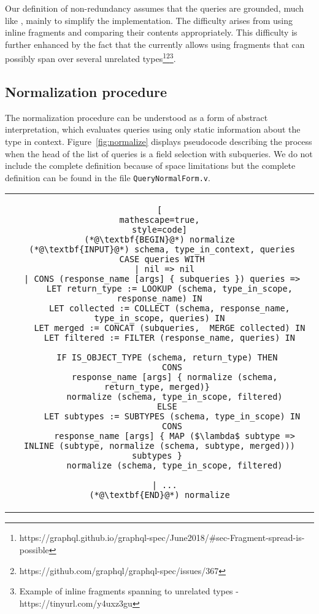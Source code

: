 Our definition of non-redundancy assumes that the queries are grounded, much like \HP{}, mainly to simplify the implementation. The difficulty arises from using inline fragments and comparing their contents appropriately. This difficulty is further enhanced by the fact that the \spec{} currently allows using fragments that can possibly span over several unrelated types\footnote{https://graphql.github.io/graphql-spec/June2018/\#sec-Fragment-spread-is-possible}\footnote{https://github.com/graphql/graphql-spec/issues/367}\footnote{Example of inline fragments spanning to unrelated types - https://tinyurl.com/y4uxz3gu}.

\subsection{Normalization procedure}\label{subsec:normalization}

The normalization procedure can be understood as a form of abstract interpretation, which evaluates queries using only static information about the type in context. Figure~\ref{fig:normalize} displays pseudocode describing the process when the head of the list of queries is a field selection with subqueries. We do not include the complete definition because of space limitations but the complete definition can be found in the file \texttt{QueryNormalForm.v}.


\begin{figure*}[h]
\centering
\begin{tabular}{c}
\begin{lstlisting}[
mathescape=true,
style=code]
(*@\textbf{BEGIN}@*) normalize
 (*@\textbf{INPUT}@*) schema, type_in_context, queries
 CASE queries WITH
  | nil => nil
  | CONS (response_name [args] { subqueries }) queries => 
    LET return_type := LOOKUP (schema, type_in_scope, response_name) IN
    LET collected := COLLECT (schema, response_name, type_in_scope, queries) IN
    LET merged := CONCAT (subqueries,  MERGE collected) IN
    LET filtered := FILTER (response_name, queries) IN
    
    IF IS_OBJECT_TYPE (schema, return_type) THEN 
     CONS
      response_name [args] { normalize (schema, return_type, merged)} 
      normalize (schema, type_in_scope, filtered)
    ELSE 
     LET subtypes := SUBTYPES (schema, type_in_scope) IN
     CONS
      response_name [args] { MAP ($\lambda$ subtype => INLINE (subtype, normalize (schema, subtype, merged))) subtypes } 
      normalize (schema, type_in_scope, filtered)
     
  | ...
(*@\textbf{END}@*) normalize
\end{lstlisting}
\end{tabular}
\caption{Pseudocode for the normalization procedure, showcasing field selections with subqueries.}
\label{fig:normalize}
\end{figure*}

